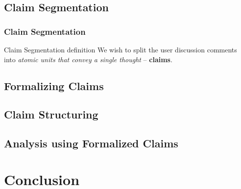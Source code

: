 \documentclass{beamer}
\begin{document}
\subsection{Claim Segmentation}
\begin{frame}
	\frametitle{Claim Segmentation}

	\begin{block}{Claim Segmentation definition}
We wish to split the user discussion comments into \emph{atomic units
that convey a single thought} -- \textbf{claims}.
	\end{block}
	
\end{frame}

\subsection{Formalizing Claims}

\subsection{Claim Structuring}

\subsection{Analysis using Formalized Claims}

\section{Conclusion}
\end{document}
